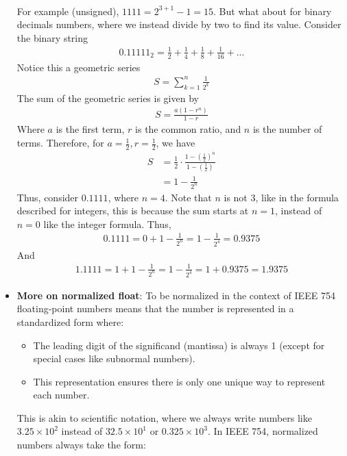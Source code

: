 \documentclass{report}
\begin{document}
\begin{itemize}
\begin{align*}
        \end{align*}
        For example (unsigned), $1111 = 2^{3+1}-1 = 15$. But what about for binary decimals numbers, where we instead divide by two to find its value. Consider the binary string
        \begin{align*}
            0.11111_{2} = \frac{1}{2} + \frac{1}{4} + \frac{1}{8} + \frac{1}{16} + ...
        \end{align*}
        Notice this a geometric series
        \begin{align*}
            S = \sum_{k=1}^{n}\frac{1}{2^{k}}
        \end{align*}
        The sum of the geometric series is given by
        \begin{align*}
            S = \frac{a(1-r^{n})}{1-r}
        \end{align*}
        Where $a$ is the first term, $r$ is the common ratio, and $n$ is the number of terms. Therefore, for $a=\frac{1}{2}, r =\frac{1}{2}$, we have
        \begin{align*}
            S &= \frac{1}{2} \cdot \frac{1-\left(\frac{1}{2}\right)^{n}}{1-\left(\frac{1}{2}\right)} \\
            &= 1-\frac{1}{2^{n}}
        \end{align*}
        Thus, consider $0.1111$, where $n=4$. Note that $n$ is not $3$, like in the formula described for integers, this is because the sum starts at $n=1$, instead of $n=0$ like the integer formula.  Thus,
        \begin{align*}
            0.1111 = 0 + 1-\frac{1}{2^{n}} = 1-\frac{1}{2^{4}} = 0.9375
        \end{align*}
        And 
        \begin{align*}
            1.1111 = 1 + 1-\frac{1}{2^{n}} = 1-\frac{1}{2^{4}} = 1 + 0.9375 = 1.9375
        \end{align*}
    \item \textbf{More on normalized float}: To be normalized in the context of IEEE 754 floating-point numbers means that the number is represented in a standardized form where:
        \begin{itemize}
            \item The leading digit of the significand (mantissa) is always 1 (except for special cases like subnormal numbers).
            \item This representation ensures there is only one unique way to represent each number.
        \end{itemize}
        \bigbreak \noindent 
        This is akin to scientific notation, where we always write numbers like 
        \( 3.25 \times 10^2 \) instead of \( 32.5 \times 10^1 \) or \( 0.325 \times 10^3 \). 
        In IEEE 754, normalized numbers always take the form:


\end{itemize}
\end{document}
